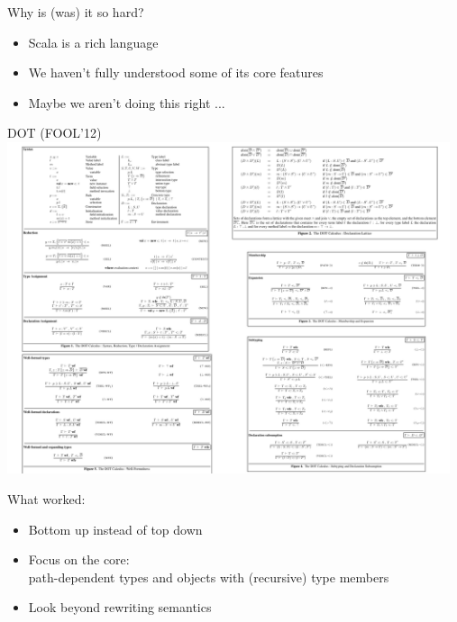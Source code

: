 \documentclass{beamer}
\begin{document}
\begin{frame}[fragile]{Why is (was) it so hard?}
\begin{itemize}
\item Scala is a rich language
\item We haven't fully understood some of its core features
\item Maybe we aren't doing this right ...
\end{itemize}
\end{frame}

\begin{frame}[fragile]{DOT (FOOL'12)}
\includegraphics[width=13cm]{fool.pdf}
\end{frame}


\begin{frame}[fragile]{What worked:}
\begin{itemize}
\item Bottom up instead of top down
\item Focus on the core: \\
path-dependent types and objects with (recursive) type members
\item Look beyond rewriting semantics

\end{itemize}
\end{frame}



\end{document}

